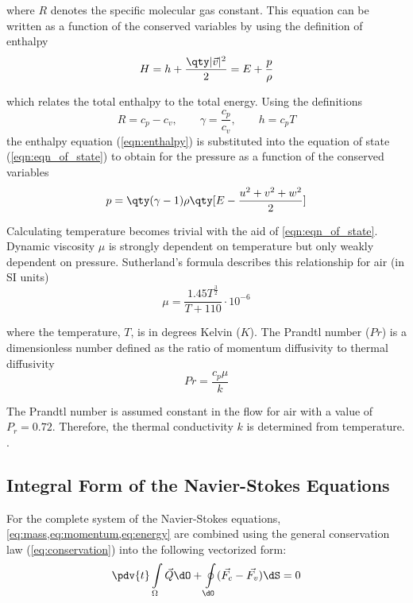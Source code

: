 \noindent
where $R$ denotes the specific molecular gas constant. This equation can be written as a function of the conserved variables by using the definition of enthalpy
%
\begin{equation} H = h + \frac{\qty|\vec{v}|^2}{2} = E + \frac{p}{\rho} \label{eqn:enthalpy} \end{equation}

\noindent
which relates the total enthalpy to the total energy. Using the definitions
%
$$ R = c_p - c_v, \qquad \gamma = \frac{c_p}{c_v}, \qquad h = c_p T $$
%
the enthalpy equation (\cref{eqn:enthalpy}) is substituted into the equation of state (\cref{eqn:eqn_of_state}) to obtain for the pressure as a function of the conserved variables
%
$$ p = \qty(\gamma - 1) \rho \qty[E - \frac{u^2+v^2+w^2}{2}] $$

Calculating temperature becomes trivial with the aid of \cref{eqn:eqn_of_state}. Dynamic viscosity $\mu$ is strongly dependent on temperature but only weakly dependent on pressure. Sutherland's formula describes this relationship for air (in SI units)
%
$$ \mu = \frac{1.45 T^{\frac{3}{2}}}{T+110} \cdot 10^{\minus 6} $$

\noindent
where the temperature, $T$, is in degrees Kelvin ($K$). %
The Prandtl number ($Pr$) is a dimensionless number defined as the ratio of momentum diffusivity to thermal diffusivity
%
$$ Pr = \dfrac{c_p \mu}{k} $$

The Prandtl number is assumed constant in the flow for air with a value of $P_r = 0.72$. Therefore, the thermal conductivity $k$ is determined from temperature. \cite{BertinText,TannehillText,BlazekText,TuText,WhiteText}.


\subsection{Integral Form of the Navier-Stokes Equations}

For the complete system of the Navier-Stokes equations, \cref{eq:mass,eq:momentum,eq:energy} are combined using the general conservation law (\cref{eq:conservation}) into the following vectorized form:
%
\begin{equation} \pdv{t} \int\limits_\Omega \vec{Q} \dO + \oint\limits_{\dO}(\vec{F_c}-\vec{F_v}) \dS = 0 \label{eq:iNS} \end{equation}

